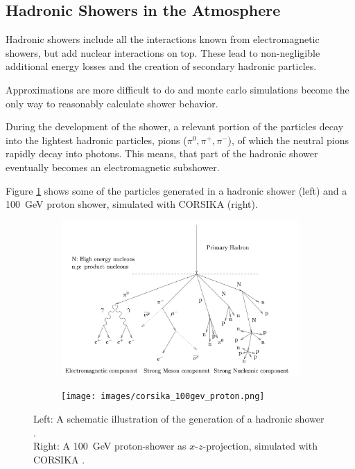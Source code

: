 \subsection{Hadronic Showers in the Atmosphere}
Hadronic showers include all the interactions known from 
electromagnetic showers, but add nuclear interactions on top.
These lead to non-negligible additional energy losses 
and the creation of secondary hadronic particles.

Approximations are more difficult to do and monte carlo simulations 
become the only way to reasonably calculate shower behavior.

During the development of the shower, a relevant portion of the particles decay into the 
lightest hadronic particles, pions ($\pi^0, \pi^+, \pi^-$), of which the neutral pions 
rapidly decay into photons.
This means, that part of the hadronic shower
eventually becomes an electromagnetic subshower.

Figure \ref{fig:proton_shower}
shows some of the particles generated in a hadronic shower (left)
and a \SI{100}{\giga\electronvolt} proton shower, simulated with CORSIKA (right).

\begin{figure}
	\centering
	\captionsetup{width=0.9\linewidth}
	\begin{subfigure}{.65\textwidth}
  		\centering
  		\includegraphics[width=\linewidth]{images/hadron_shower_illustration.png}
	\end{subfigure}%
	\begin{subfigure}{.15\textwidth}
 		\centering
		\texttt{[image: images/corsika\_100gev\_proton.png]}
	\end{subfigure}
	\caption{
		Left: A schematic illustration of the generation of a hadronic shower \cite{funk_doctor}.\\
		Right: A \SI{100}{\giga\electronvolt} proton-shower as $x$-$z$-projection,
		simulated with CORSIKA \cite{corsika_showers}.}
	\label{fig:proton_shower}
\end{figure}


